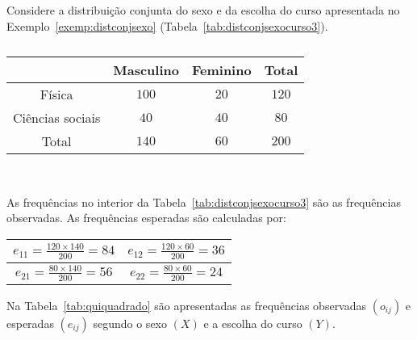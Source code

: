 \documentclass[11pt,fleqn]{book} %
\begin{document}
\begin{example} \label{exemp:quiquadrado}

Considere a distribuição conjunta do sexo e da escolha do curso apresentada no Exemplo~\ref{exemp:distconjsexo} (Tabela~\ref{tab:distconjsexocurso3}). \\

\begin{table}[h]
	\begin{rBox}
	\captionsetup{labelformat=empty}
	\caption{}
	\centering
	{\color{olivine!130} 
	\begin{tabular}{c | c c | c}
	\toprule
	\backslashbox{$\bm Y$}{$\bm X$} & \textbf{Masculino} & \textbf{Feminino} & \textbf{Total} \\
	\midrule
	Física & $100$ & $20$ & $120$ \\
	Ciências sociais & $40$ & $40$ & $80$ \\
	\midrule
	Total & $140$ & $60$ & $200$ \\
	\bottomrule
	\end{tabular}} \\
	\end{rBox}
\end{table}

As frequências no interior da Tabela~\ref{tab:distconjsexocurso3} são as frequências observadas. As frequências esperadas são calculadas por: \\

\begin{center}
\begin{tabular}{c | c}
\midrule
$\displaystyle e_{11}=\frac{120 \times 140}{200}=84$ & $\displaystyle e_{12}=\frac{120 \times 60}{200}=36$ \\
\midrule
$\displaystyle e_{21}=\frac{80 \times 140}{200}=56$ & $\displaystyle e_{22}=\frac{80 \times 60}{200}=24$ \\
\midrule
\end{tabular}
\end{center}

\vspace{0,3cm}

Na Tabela~\ref{tab:quiquadrado} são apresentadas as frequências observadas $(o_{ij})$ e esperadas $(e_{ij})$ segundo o sexo $(X)$ e a escolha do curso $(Y)$. \\



\end{example}
\end{document}

